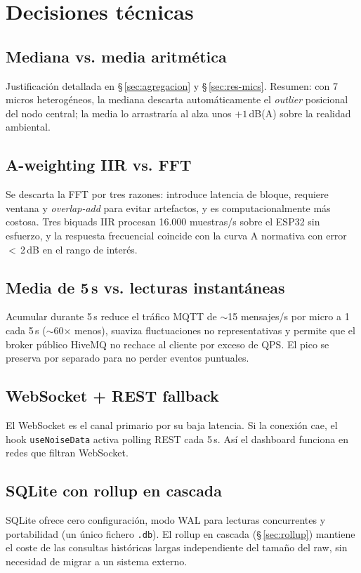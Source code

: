 \documentclass[11pt,a4paper,openany]{report}
\begin{document}
\chapter{Decisiones t\'ecnicas}

\section{Mediana vs. media aritm\'etica}
Justificaci\'on detallada en \S\,\ref{sec:agregacion} y \S\,\ref{sec:res-mics}. Resumen: con 7 micros heterog\'eneos, la mediana descarta autom\'aticamente el \emph{outlier} posicional del nodo central; la media lo arrastrar\'ia al alza unos $+1$\,dB(A) sobre la realidad ambiental.

\section{A-weighting IIR vs. FFT}
Se descarta la FFT por tres razones: introduce latencia de bloque, requiere ventana y \emph{overlap-add} para evitar artefactos, y es computacionalmente m\'as costosa. Tres biquads IIR procesan 16.000 muestras/s sobre el ESP32 sin esfuerzo, y la respuesta frecuencial coincide con la curva A normativa con error $<$\,2\,dB en el rango de inter\'es.

\section{Media de 5\,s vs. lecturas instant\'aneas}
Acumular durante 5\,s reduce el tr\'afico MQTT de $\sim$15 mensajes/s por micro a 1 cada 5\,s ($\sim$60$\times$ menos), suaviza fluctuaciones no representativas y permite que el broker p\'ublico HiveMQ no rechace al cliente por exceso de QPS. El pico se preserva por separado para no perder eventos puntuales.

\section{WebSocket + REST fallback}
El WebSocket es el canal primario por su baja latencia. Si la conexi\'on cae, el hook \texttt{useNoiseData} activa polling REST cada 5\,s. As\'i el dashboard funciona en redes que filtran WebSocket.

\section{SQLite con rollup en cascada}
SQLite ofrece cero configuraci\'on, modo WAL para lecturas concurrentes y portabilidad (un \'unico fichero \texttt{.db}). El rollup en cascada (\S\,\ref{sec:rollup}) mantiene el coste de las consultas hist\'oricas largas independiente del tama\~no del raw, sin necesidad de migrar a un sistema externo.
\end{document}
